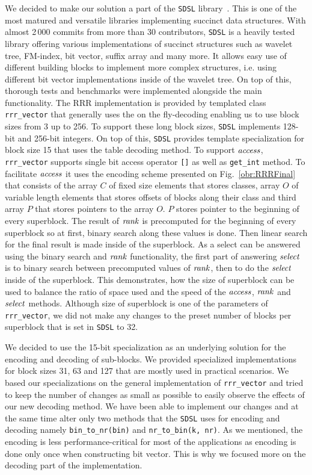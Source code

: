 We decided to make our solution a part of the \texttt{SDSL} library~\citep{gog2014theory}. This
is one of the most matured and versatile libraries implementing succinct data structures.
With almost 2\,000 commits from more than 30 contributors, \texttt{SDSL} is a heavily tested library
offering various implementations of succinct structures such as wavelet tree, FM-index,
bit vector, suffix array and many more. It allows easy use of different building blocks
to implement more complex structures, i.e. using different bit vector implementations inside
of the wavelet tree. On top of this, thorough tests and benchmarks were implemented alongside
the main functionality. The RRR implementation is provided by templated class \texttt{rrr\_vector}
that generally uses the on the fly-decoding enabling us to use block sizes from 3 up to 256. To support
these long block sizes, \texttt{SDSL} implements 128-bit and 256-bit integers. On top of this, \texttt{SDSL}
provides template specialization for block size 15 that uses the table decoding method. To support $\mathit{access}$,
\texttt{rrr\_vector} supports single bit access operator \texttt{[]} as well as \texttt{get\_int} method.
To facilitate $\mathit{access}$ it uses the encoding scheme presented on Fig.~\ref{obr:RRRFinal} that
consists of the array $C$ of fixed size elements that stores classes, array $O$ of variable length
elements that stores offsets of blocks along their class and third array $P$ that stores pointers
to the array $O$. $P$ stores pointer to the beginning of every superblock. The result of $\mathit{rank}$ is
precomputed for the beginning of every superblock so at first, binary search along these values
is done. Then linear search for the final result is made inside of the superblock. As a select
can be answered using the binary search and $\mathit{rank}$ functionality, the first part of answering $\mathit{select}$ is to
binary search between precomputed values of $\mathit{rank}$, then to do the $\mathit{select}$ inside of the superblock.
This demonstrates, how the size of superblock can be used to balance the ratio of space used and the
speed of the $\mathit{access}$, $\mathit{rank}$ and $\mathit{select}$ methods. Although size of superblock is one of the parameters
of \texttt{rrr\_vector}, we did not make any changes to the preset number of blocks per superblock that is
set in \texttt{SDSL} to 32.

We decided to use the 15-bit specialization as an underlying solution for the encoding and decoding of
sub-blocks. We provided specialized implementations for block sizes 31, 63 and 127 that are mostly used
in practical scenarios. We based our specializations on the general implementation of
\texttt{rrr\_vector} and tried to keep the number of changes as small as possible to easily observe the
effects of our new decoding method. We have been able to implement our changes and at the same time alter
only two methods that the \texttt{SDSL} uses for encoding and decoding namely \texttt{bin\_to\_nr(bin)} and
\texttt{nr\_to\_bin(k, nr)}. As we mentioned, the encoding is less performance-critical for most of the applications
as encoding is done only once when constructing bit vector. This is why we focused more on the decoding
part of the implementation.

